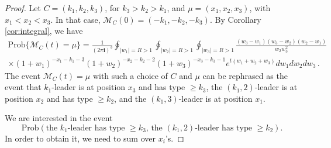 \documentclass[11pt,reqno]{amsart}
\theoremstyle{definition}
\theoremstyle{remark}
\theoremstyle{remark}
\def\geq{\geqslant}
\renewcommand\ge{\geq}
\def\M{\mathcal M}
\newcommand{\ii}{{\mathbf i}}
\numberwithin{equation}{section}
\begin{document}
	\begin{proof}
		
		Let $C=(k_1, k_2,k_3)$, for $k_3>k_2>k_1$, and $\mu = (x_1,x_2,x_3)$, with $x_1<x_2<x_3$. In that case, $\M_C(0)= (-k_1, -k_2,-k_3)$. By Corollary \ref{cor:integral}, we have
		\begin{equation}\label{eq:obs2-2-2var}
			\begin{gathered}
				\mathrm{Prob}\{\M_C(t)=\mu\}=\frac{1}{(2\pi \ii)^3} \oint_{|w_1|=R>1} \oint_{|w_2|=R>1} \oint_{|w_3|=R>1} \frac{(w_3-w_1)(w_3-w_2)(w_2-w_1)}{w_2 w_3^2} \\ \times (1+w_1)^{-x_1-k_1-3} (1+w_2)^{-x_2-k_2-2} (1+w_3)^{-x_3-k_3-1} 
				{e^{t(w_1+w_2 + w_3)} d w_1 d w_2 d w_3}\,.
			\end{gathered}
		\end{equation}
		The event $\M_C(t)=\mu$ with such a choice of $C$ and $\mu$ can be rephrased as the event that $k_1$-leader is at position $x_3$ and has type $\ge k_3$, the $(k_1,2)$-leader is at position $x_2$ and has type $\ge k_2$, and the $(k_1,3)$-leader is at position $x_1$. 
		
		We are interested in the event
		\begin{equation}
			\label{eq:asymp2joint1}
			\mathrm{Prob} \left( \mbox{the $k_1$-leader has type $\ge k_3$, } \mbox{the $(k_1, 2)$-leader has type $\ge k_2$} \right).
		\end{equation}
		In order to obtain it, we need to sum over $x_i$'s. 
		

\end{proof}
\end{document}
